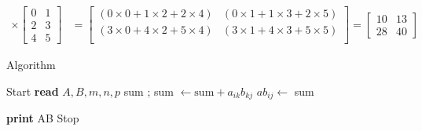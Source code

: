 \documentclass[11pt]{ipu-c}
\begin{document}
{\begin{align*}
            \times
            \begin{bmatrix}
                0 & 1 \\
                2 & 3 \\
                4 & 5
            \end{bmatrix}
            &=
            \begin{bmatrix}
                \left( 0\times{0} + 1\times{2} + 2\times{4} \right)
                & \left( 0\times{1} + 1\times{3} + 2\times{5} \right) \\
                \left( 3\times{0} + 4\times{2} + 5\times{4} \right)
                & \left( 3\times{1} + 4\times{3} + 5\times{5} \right) \\
            \end{bmatrix}
            =
            \begin{bmatrix}
                10 & 13 \\
                28 & 40
            \end{bmatrix}
        \end{align*}
    }

    \begin{tabularsection}{Algorithm}
        \begin{algorithmic}[1]
            \State Start
            \State \textbf{read} $A, B, m, n, p$
                    \State sum ;
                        \State sum $\gets \text{sum} + a_{ik} b_{kj}$
                    \EndFor
                    \State $ab_{ij} \gets$ sum
                \EndFor
            \EndFor

            \State \textbf{print} AB
            \State Stop
        \end{algorithmic}
    \end{tabularsection}
\end{document}
